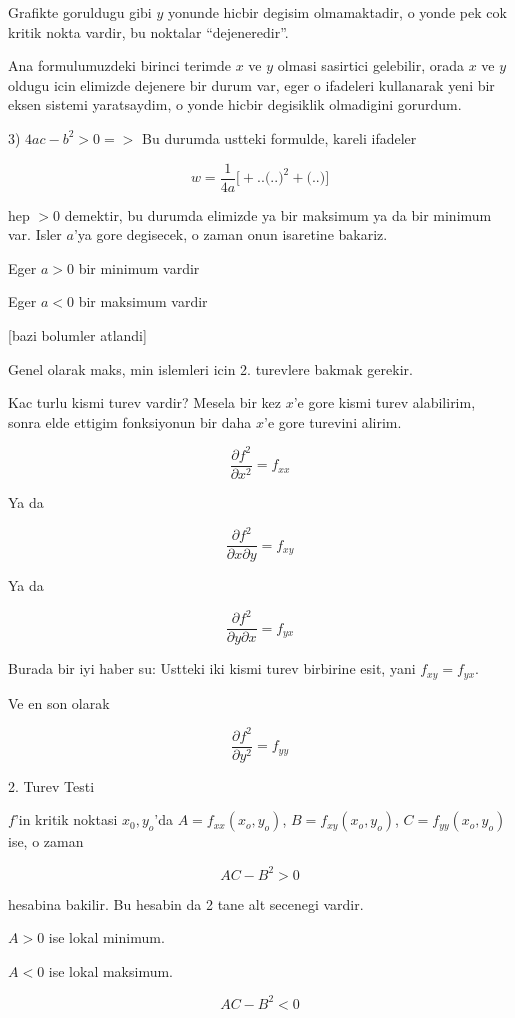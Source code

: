 \documentclass[12pt,fleqn]{article}
\begin{document}
Grafikte goruldugu gibi $y$ yonunde hicbir degisim olmamaktadir, o yonde
pek cok kritik nokta vardir, bu noktalar ``dejeneredir''. 

Ana formulumuzdeki birinci terimde $x$ ve $y$ olmasi sasirtici gelebilir,
orada $x$ ve $y$ oldugu icin elimizde dejenere bir durum var, eger o
ifadeleri kullanarak yeni bir eksen sistemi yaratsaydim, o yonde hicbir
degisiklik olmadigini gorurdum.

3) $4ac - b^2 > 0 => $ Bu durumda ustteki formulde, kareli ifadeler 

\[w = \frac{1}{4a} 
\bigg[
+ .. \bigg( .. \bigg)^2 +
\bigg( .. \bigg)
\bigg]
\]

hep $>0$ demektir, bu durumda elimizde ya bir maksimum ya da bir minimum
var. Isler $a$'ya gore degisecek, o zaman onun isaretine bakariz. 

Eger $a > 0$ bir minimum vardir

Eger $a < 0$ bir maksimum vardir

[bazi bolumler atlandi]

Genel olarak maks, min islemleri icin 2. turevlere bakmak gerekir. 

Kac turlu kismi turev vardir? Mesela bir kez $x$'e gore kismi turev alabilirim,
sonra elde ettigim fonksiyonun bir daha $x$'e gore turevini alirim. 

\[ \frac{\partial f^2}{\partial x^2} = f_{xx}\]

Ya da

\[ 
\frac{\partial f^2}{\partial x \partial y} = f_{xy}
 \]

Ya da 

\[ 
\frac{\partial f^2}{\partial y \partial x} = f_{yx}
 \]

Burada bir iyi haber su: Ustteki iki kismi turev birbirine esit, yani
$f_{xy} = f_{yx}$.

Ve en son olarak

\[ \frac{\partial f^2}{\partial y^2} = f_{yy}\]

2. Turev Testi

$f$'in kritik noktasi $x_0,y_o$'da $A = f_{xx}(x_o,y_o)$, $B =
f_{xy}(x_o,y_o)$, 
$C = f_{yy}(x_o,y_o)$ ise, o zaman 

\[ AC - B^2 > 0 \]

hesabina bakilir. Bu hesabin da 2 tane alt secenegi vardir. 

$A > 0$ ise lokal minimum. 

$A < 0$ ise lokal maksimum. 

\[ AC - B^2 < 0 \]
\end{document}
